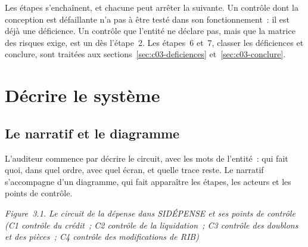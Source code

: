 Les étapes s'enchaînent, et chacune peut arrêter la suivante. Un contrôle
dont la conception est défaillante n'a pas à être testé dans son
fonctionnement~: il est déjà une déficience. Un contrôle que l'entité ne
déclare pas, mais que la matrice des risques exige, est un \NON{} dès
l'étape~2. Les étapes~6 et~7, classer les déficiences et conclure, sont
traitées aux sections~\ref{sec:c03-deficiences} et~\ref{sec:c03-conclure}.

\separateur

\section{Décrire le système}
\label{sec:c03-decrire}

\subsection{Le narratif et le diagramme}

L'auditeur commence par décrire le circuit, avec les mots de l'entité~:
qui fait quoi, dans quel ordre, avec quel écran, et quelle trace reste.
Le narratif s'accompagne d'un diagramme, qui fait apparaître les étapes,
les acteurs et les points de contrôle.

\begin{center}
\end{center}
\vspace{-0.4em}
\begin{center}{\small\itshape Figure~3.1. Le circuit de la dépense dans
SIDÉPENSE et ses points de contrôle (C1 contrôle du crédit~; C2 contrôle
de la liquidation~; C3 contrôle des doublons et des pièces~; C4 contrôle
des modifications de RIB)}\end{center}

